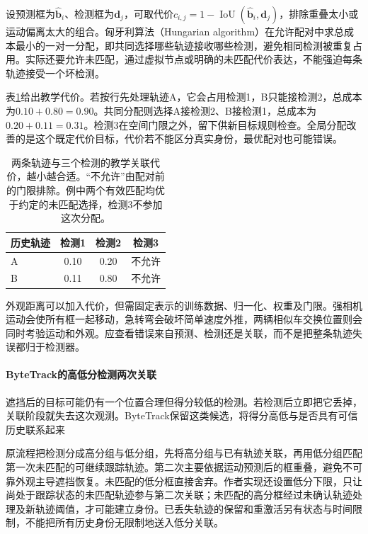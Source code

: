 设预测框为$\widehat{\bm{b}}_i$、检测框为$\bm{d}_j$，可取代价$c_{i,j}=1-\operatorname{IoU}(\widehat{\bm{b}}_i,\bm{d}_j)$，排除重叠太小或运动偏离太大的组合。匈牙利算法（Hungarian algorithm）在允许配对中求总成本最小的一对一分配，即共同选择哪些轨迹接收哪些检测，避免相同检测被重复占用。实际还要允许未匹配，通过虚拟节点或明确的未匹配代价表达，不能强迫每条轨迹接受一个坏检测。

表\ref{tab:vision-association-cost}给出教学代价。若按行先处理轨迹A，它会占用检测1，B只能接检测2，总成本为$0.10+0.80=0.90$。共同分配则选择A接检测2、B接检测1，总成本为$0.20+0.11=0.31$。检测3在空间门限之外，留下供新目标规则检查。全局分配改善的是这个既定代价目标，代价若不能区分真实身份，最优配对也可能错误。
\begin{table}[htbp]
  \centering
  \begin{tabular}{lccc}
    \toprule
    历史轨迹 & 检测1 & 检测2 & 检测3\\
    \midrule
    A & 0.10 & 0.20 & 不允许\\
    B & 0.11 & 0.80 & 不允许\\
    \bottomrule
  \end{tabular}
  \caption{两条轨迹与三个检测的教学关联代价，越小越合适。“不允许”由配对前的门限排除。例中两个有效匹配均优于约定的未匹配选择，检测3不参加这次分配。}
  \label{tab:vision-association-cost}
\end{table}

外观距离可以加入代价，但需固定表示的训练数据、归一化、权重及门限。强相机运动会使所有框一起移动，急转弯会破坏简单速度外推，两辆相似车交换位置则会同时考验运动和外观。应查看错误来自预测、检测还是关联，而不是把整条轨迹失误都归于检测器。

\paragraph{ByteTrack的高低分检测两次关联}
\label{sec:vision-video-bytetrack}

遮挡后的目标可能仍有一个位置合理但得分较低的检测。若检测后立即把它丢掉，关联阶段就失去这次观测。ByteTrack保留这类候选，将得分高低与是否具有可信历史联系起来

原流程把检测分成高分组与低分组，先将高分组与已有轨迹关联，再用低分组匹配第一次未匹配的可继续跟踪轨迹。第二次主要依据运动预测后的框重叠，避免不可靠外观主导遮挡恢复。未匹配的低分框直接舍弃。作者实现还设置低分下限，只让尚处于跟踪状态的未匹配轨迹参与第二次关联；未匹配的高分框经过未确认轨迹处理及新轨迹阈值，才可能建立身份。已丢失轨迹的保留和重激活另有状态与时间限制，不能把所有历史身份无限制地送入低分关联。

